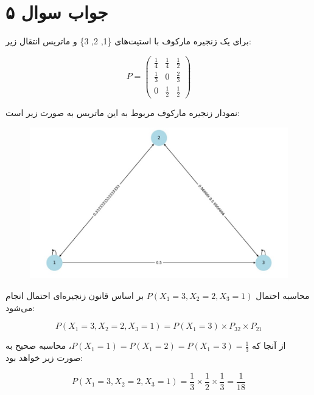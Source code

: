 \section*{جواب سوال ۵}

برای یک زنجیره مارکوف با استیت‌های \{1, 2, 3\} و ماتریس انتقال زیر:

\[
P = \begin{pmatrix}
	\frac{1}{4} & \frac{1}{4} & \frac{1}{2} \\
	\frac{1}{3} & 0 & \frac{2}{3} \\
	0 & \frac{1}{2} & \frac{1}{2}
\end{pmatrix}
\]

نمودار زنجیره مارکوف مربوط به این ماتریس به صورت زیر است:

\begin{figure}[H]
	\centering
	\includegraphics{pic1.jpg}
	\label{fig:label4}
\end{figure}

محاسبه احتمال \(P(X_1 = 3, X_2 = 2, X_3 = 1)\) بر اساس قانون زنجیره‌ای احتمال انجام می‌شود:

\[
P(X_1 = 3, X_2 = 2, X_3 = 1) = P(X_1 = 3) \times P_{32} \times P_{21}
\]

از آنجا که \(P(X_1 = 1) = P(X_1 = 2) = P(X_1 = 3) = \frac{1}{3}\)، محاسبه صحیح به صورت زیر خواهد بود:

\[
P(X_1 = 3, X_2 = 2, X_3 = 1) = \frac{1}{3} \times \frac{1}{2} \times \frac{1}{3} = \frac{1}{18}
\]